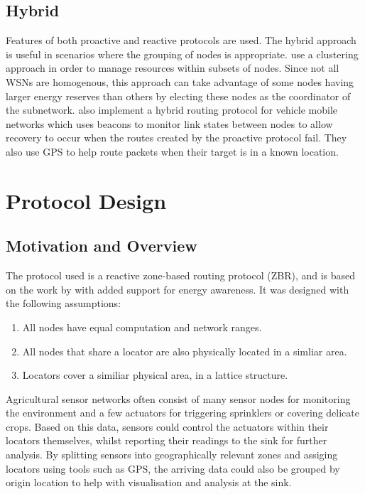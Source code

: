 \documentclass[12pt]{article}
\begin{document}
\subsection{Hybrid} 
Features of both proactive and reactive protocols are used. The hybrid approach is useful in scenarios where the grouping of nodes is appropriate. \cite{cluster} use a clustering approach in order to manage resources within subsets of nodes. Since not all WSNs are homogenous, this approach can take advantage of some nodes having larger energy reserves than others by electing these nodes as the coordinator of the subnetwork. \cite{vanet} also implement a hybrid routing protocol for vehicle mobile networks which uses beacons to monitor link states between nodes to allow recovery to occur when the routes created by the proactive protocol fail. They also use GPS to help route packets when their target is in a known location.

\pagebreak
\section{Protocol Design} \label{protodesign}

\subsection{Motivation and Overview}

The protocol used is a reactive zone-based routing protocol (ZBR), and is based on the work by \cite{zbrp} with added support for energy awareness. It was designed with the following assumptions:

\begin{enumerate}
	\item All nodes have equal computation and network ranges.
	\item All nodes that share a locator are also physically located in a simliar area.
	\item Locators cover a similiar physical area, in a lattice structure.
\end{enumerate}

Agricultural sensor networks often consist of many sensor nodes for monitoring the environment and a few actuators for triggering sprinklers or covering delicate crops. Based on this data, sensors could control the actuators within their locators themselves, whilst reporting their readings to the sink for further analysis. By splitting sensors into geographically relevant zones and assiging locators using tools such as GPS, the arriving data could also be grouped by origin location to help with visualisation and analysis at the sink. 
\end{document}
